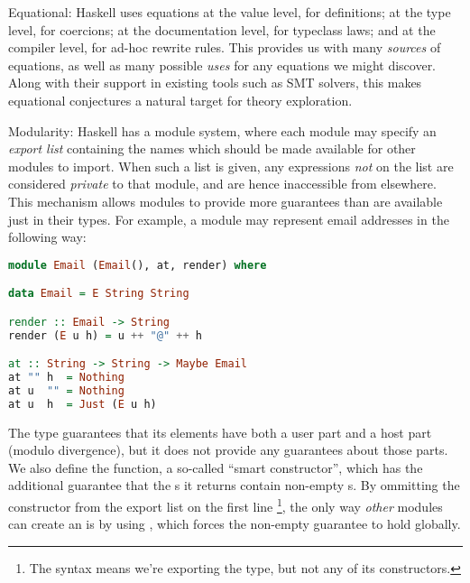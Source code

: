 \begin{description}
\item{Equational}: Haskell uses equations at the value level, for definitions; at the type level, for coercions; at the documentation level, for typeclass laws; and at the compiler level, for ad-hoc rewrite rules. This provides us with many \emph{sources} of equations, as well as many possible \emph{uses} for any equations we might discover. Along with their support in existing tools such as SMT solvers, this makes equational conjectures a natural target for theory exploration.

\item{Modularity}: Haskell has a module system, where each module may specify an \emph{export list} containing the names which should be made available for other modules to import. When such a list is given, any expressions \emph{not} on the list are considered \emph{private} to that module, and are hence inaccessible from elsewhere. This mechanism allows modules to provide more guarantees than are available just in their types. For example, a module may represent email addresses in the following way:

\begin{lstlisting}[language=Haskell, xleftmargin=.2\textwidth, xrightmargin=.2\textwidth, upquote=true]
module Email (Email(), at, render) where

data Email = E String String

render :: Email -> String
render (E u h) = u ++ "@" ++ h

at :: String -> String -> Maybe Email
at "" h  = Nothing
at u  "" = Nothing
at u  h  = Just (E u h)
\end{lstlisting}

The  type guarantees that its elements have both a user part and a host part (modulo divergence), but it does not provide any guarantees about those parts. We also define the  function, a so-called ``smart constructor'', which has the additional guarantee that the s it returns contain non-empty s. By ommitting the  constructor from the export list on the first line \footnote{The syntax  means we're exporting the  type, but not any of its constructors.}, the only way \emph{other} modules can create an  is by using , which forces the non-empty guarantee to hold globally.

\end{description}

